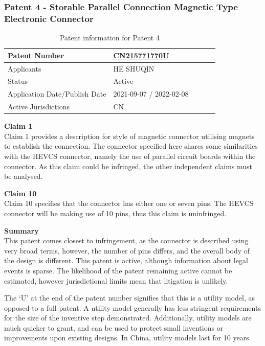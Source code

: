 \documentclass [12pt]{article}
\begin{document}
\subsubsection{Patent 4 - Storable Parallel Connection Magnetic Type Electronic Connector}
\begin{table}[H]
    \centering
    \setlength{\arrayrulewidth}{1.5pt}
    \begin{tabular}{|p{0.5\linewidth}|p{0.5\linewidth}|}
    \hline
    Patent Number & \href{https://worldwide.espacenet.com/patent/search/family/080088809/publication/CN215771770U?q=CN215771770U}{CN215771770U}\\
    \hline
    Applicants &HE SHUQIN\\
    \hline
    Status & Active\\
    \hline
    Application Date/Publish Date & 2021-09-07 / 2022-02-08\\
    \hline
    Active Jurisdictions & CN\\
    \hline
    \end{tabular}
    \caption{Patent information for Patent 4}
    \label{table:mag_con4}
\end{table}
\textbf{Claim 1}\\
Claim 1 provides a description for style of magnetic connector utilising magnets to establish the connection. The connector specified here shares some similarities with the HEVCS connector, namely the use of parallel circuit boards within the connector. As this claim could be infringed, the other independent claims must be analysed.

\textbf{Claim 10}\\
Claim 10 specifies that the connector has either one or seven pins. The HEVCS connector will be making use of 10 pins, thus this claim is uninfringed.

\textbf{Summary}\\
This patent comes closest to infringement, as the connector is described using very broad terms, however, the number of pins differs, and the overall body of the design is different. This patent is active, although information about legal events is sparse. The likelihood of the patent remaining active cannot be estimated, however jurisdictional limits mean that litigation is unlikely.

The ‘U’ at the end of the patent number signifies that this is a utility model, as opposed to a full patent. A utility model generally has less stringent requirements for the size of the inventive step demonstrated. Additionally, utility models are much quicker to grant, and can be used to protect small inventions or improvements upon existing designs. In China, utility models last for 10 years.
\end{document}

